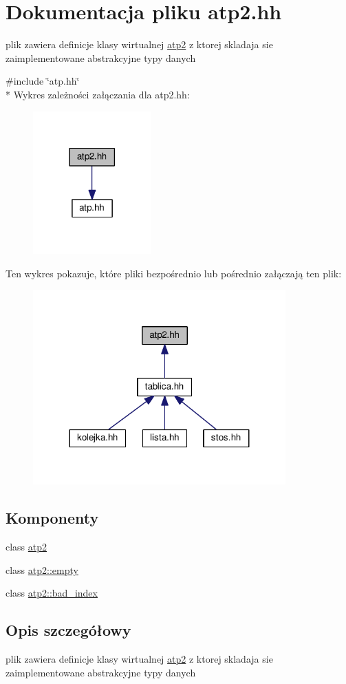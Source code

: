 \hypertarget{atp2_8hh}{}\section{Dokumentacja pliku atp2.\+hh}
\label{atp2_8hh}


plik zawiera definicje klasy wirtualnej \hyperlink{classatp2}{atp2} z ktorej skladaja sie zaimplementowane abstrakcyjne typy danych  


{\ttfamily \#include \char`\"{}atp.\+hh\char`\"{}}\\*
Wykres zależności załączania dla atp2.\+hh\+:\nopagebreak
\begin{figure}[H]
\begin{center}
\leavevmode
\includegraphics[width=129pt]{atp2_8hh__incl}
\end{center}
\end{figure}
Ten wykres pokazuje, które pliki bezpośrednio lub pośrednio załączają ten plik\+:
\nopagebreak
\begin{figure}[H]
\begin{center}
\leavevmode
\includegraphics[width=275pt]{atp2_8hh__dep__incl}
\end{center}
\end{figure}
\subsection*{Komponenty}
\begin{DoxyCompactItemize}
\item 
class \hyperlink{classatp2}{atp2}
\item 
class \hyperlink{classatp2_1_1empty}{atp2\+::empty}
\item 
class \hyperlink{classatp2_1_1bad__index}{atp2\+::bad\+\_\+index}
\end{DoxyCompactItemize}


\subsection{Opis szczegółowy}
plik zawiera definicje klasy wirtualnej \hyperlink{classatp2}{atp2} z ktorej skladaja sie zaimplementowane abstrakcyjne typy danych 

